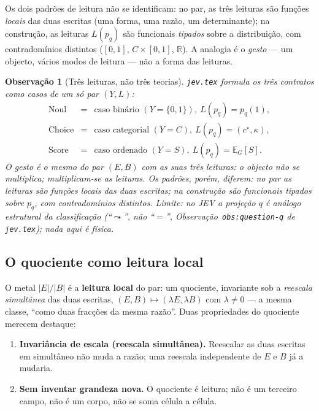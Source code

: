 \documentclass[11pt,a4paper]{article}
\newtheorem{observacao}{Observação}
\newcommand{\abs}[1]{\lvert #1\rvert}
\begin{document}
Os dois padrões de leitura não se identificam: no par, as três leituras são
funções \emph{locais} das duas escritas (uma forma, uma razão, um
determinante); na construção, as leituras $L(p_q)$ são funcionais \emph{tipados}
sobre a distribuição, com contradomínios distintos ($[0,1]$, $C\times[0,1]$,
$\mathbb R$). A analogia é o \emph{gesto} --- um objecto, vários modos de
leitura --- não a forma das leituras.

\begin{observacao}[Três leituras, não três teorias]
\label{obs:tres-leituras}
\texttt{jev.tex} formula os três contratos como casos de um só par
$(Y,L)$:
\[
\begin{array}{rcl}
\text{Noul} &=& \text{caso binário }(Y=\{0,1\}),\ L(p_q)=p_q(1),\\[2pt]
\text{Choice} &=& \text{caso categorial }(Y=C),\ L(p_q)=(c^\star,\kappa),\\[2pt]
\text{Score} &=& \text{caso ordenado }(Y=S),\ L(p_q)=\mathbb E_G[S].
\end{array}
\]
O gesto é o mesmo do par $(E,B)$ com as suas três leituras: \emph{o
objecto não se multiplica; multiplicam-se as leituras}. Os padrões, porém,
diferem: no par as leituras são funções locais das duas escritas; na construção
são funcionais tipados sobre $p_q$, com contradomínios distintos. Limite: no
JEV a
projeção $q$ é análogo estrutural da classificação (``$\leadsto$'', não ``$=$'',
Observação~\texttt{obs:question-q} de \texttt{jev.tex}); nada aqui é física.
\end{observacao}

\subsection{O quociente como leitura local}

O metal $\abs{E}/\abs{B}$ é a \textbf{leitura local} do par: um quociente,
invariante sob a \emph{reescala simultânea} das duas escritas,
$(E,B)\mapsto(\lambda E,\lambda B)$ com $\lambda\neq0$ --- a mesma classe,
``como duas fracções da mesma razão''. Duas propriedades do quociente merecem
destaque:

\begin{enumerate}[leftmargin=1.5em]
\item \textbf{Invariância de escala (reescala simultânea).} Reescalar as duas
      escritas em simultâneo não muda a razão; uma reescala independente de $E$
      e $B$ já a mudaria.
\item \textbf{Sem inventar grandeza nova.} O quociente é leitura; não é um
      terceiro campo, não é um corpo, não se soma célula a célula.
\end{enumerate}
\end{document}
